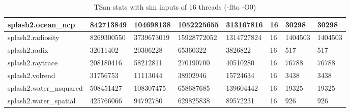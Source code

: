 \begin{table}[htbp]
{\begin{tabular}{|l|l|l|l|l|l|l|l|}
splash2.ocean\_ncp &  842713849 &  104698138 &  1052225655 &  313167816 &  16 &  30298 &  30298 \\ \hline 
splash2.radiosity &  8269300550 &  3739673019 &  15928772052 &  1314727824 &  16 &  1404503 &  1404503 \\ \hline 
splash2.radix &  32011402 &  20306228 &  65360322 &  3826822 &  16 &  517 &  517 \\ \hline 
splash2.raytrace &  208180416 &  58212811 &  270190700 &  40510280 &  16 &  76788 &  76788 \\ \hline 
splash2.volrend &  31756753 &  11113044 &  38902946 &  15724634 &  16 &  3438 &  3438 \\ \hline 
splash2.water\_nsquared &  508451427 &  108307475 &  658687685 &  139604442 &  16 &  19325 &  19325 \\ \hline 
splash2.water\_spatial &  425766066 &  94792780 &  629825838 &  89572231 &  16 &  926 &  926 \\ \hline 
\end{tabular}


}
\caption{TSan stats with sim inputs of 16 threads (-flto -O0) }
\end{table}




